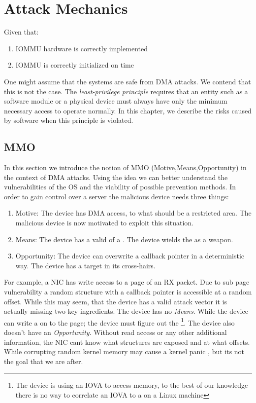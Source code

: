 \section{Attack Mechanics}
Given that:
\begin{enumerate}
    \item IOMMU hardware is correctly implemented 
    \item IOMMU is correctly initialized on time
\end{enumerate}
One might assume that the systems are safe from DMA attacks. We contend that this is not the case. The \textit{least-privilege principle} requires that an entity such as a software module or a physical device must always have only the minimum necessary access to operate normally. In this chapter, we describe the risks caused by software when this principle is violated.
\subsection{MMO}
In this section we introduce the notion of MMO (Motive,Means,Opportunity) in the context of DMA attacks. Using the idea we can better understand the vulnerabilities of the OS and the viability of possible prevention methods. In order to gain control over a server the malicious device needs three things:
\begin{enumerate}
    \item Motive: The device has DMA access, to what should be a restricted area. The malicious device is now motivated to exploit this situation. 
    \item Means: The device has a valid \kva of a \mabaf. The device wields the \kva as a weapon.
    \item Opportunity: The device can overwrite a callback pointer in a deterministic way. The device has a target in its cross-hairs.
\end{enumerate}
For example, a NIC has write access to a page of an RX packet. Due to sub page vulnerability a random structure with a callback pointer is accessible at a random offset. While this may seem, that the device has a valid attack vector it is actually missing two key ingredients. The device has no \textit{Means}. While the device can write a \mabaf on to the page; the device must figure out the \kva\footnote{The device is using an IOVA to access memory, to the best of our knowledge there is no way to correlate an IOVA to a \kva on a Linux machine}. The device also doesn't have an \textit{Opportunity}. Without  read access or any other additional information, the NIC cant know what structures are exposed and at what offsets. While corrupting random kernel memory may cause a kernel panic \cite{MMT16}, but its not the goal that we are after.

